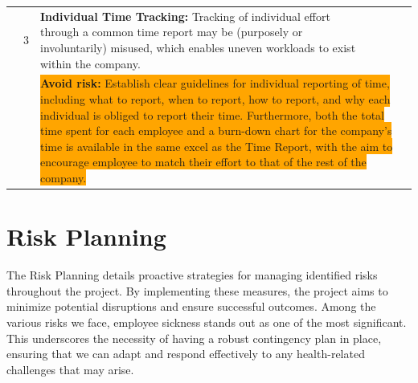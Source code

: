 \documentclass{article}
\begin{document}
\begin{flushleft}
\begin{tabular}{|p{1cm}|c|p{5cm}|>{\centering\arraybackslash}p{2cm}|>{\centering\arraybackslash}p{2cm}|>{\centering\arraybackslash}p{2cm}|}
        \cline{2-6} 
        & 3
        & \textbf{Individual Time Tracking:} Tracking of individual effort through a common time report may be (purposely or involuntarily) misused, which enables uneven workloads to exist within the company. 
        & 3 & 3 & 9 \\
        \cline{3-6} 
        & & \multicolumn{4}{|p{12.5cm}|}{\colorbox{orange}{\parbox{12.5cm}{\textbf{Avoid risk:} Establish clear guidelines for individual reporting of time, including what to report, when to report, how to report, and why each individual is obliged to report their time. Furthermore, both the total time spent for each employee and a burn-down chart for the company's time is available in the same excel as the Time Report, with the aim to encourage employee to match their effort to that of the rest of the company.}}} \\
        \cline{2-6} 
        \hline
    \end{tabular}
    \end{flushleft}

\newpage
\section{Risk Planning}

The Risk Planning details proactive strategies for managing identified risks throughout the project. By implementing these measures, the project aims to minimize potential disruptions and ensure successful outcomes. Among the various risks we face, employee sickness stands out as one of the most significant. This underscores the necessity of having a robust contingency plan in place, ensuring that we can adapt and respond effectively to any health-related challenges that may arise.
\end{document}

